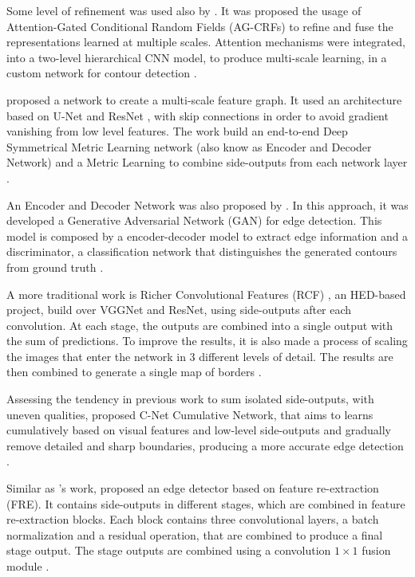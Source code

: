 Some level of refinement was used also by \cite{DeepStructured:2017:Xu20173962} \cite{Xu:2020}.
It was proposed the usage of Attention-Gated Conditional Random Fields (AG-CRFs) to refine and fuse the representations learned at multiple scales.
Attention mechanisms were integrated, into a two-level hierarchical CNN model, to produce multi-scale learning, in a custom network for contour detection \cite{DeepStructured:2017:Xu20173962}.

\cite{ProeminentEdge:2018:Cai2018} proposed a network to create a multi-scale feature graph.
It used an architecture based on U-Net \cite{Unet:2015} and ResNet \cite{RESNET:2016:7780459}, with skip connections in order to avoid gradient vanishing from low level features.
The work build an end-to-end Deep Symmetrical Metric Learning network (also know as Encoder and Decoder Network) and a Metric Learning to combine side-outputs from each network layer \cite{ProeminentEdge:2018:Cai2018}.

An Encoder and Decoder Network was also proposed by \cite{Yang:2019}.
In this approach, it was developed a Generative Adversarial Network (GAN) for edge detection.
This model is composed by a encoder-decoder model to extract edge information and a discriminator, a classification network that distinguishes the generated contours from ground truth \cite{Yang:2019}.

A more traditional work is Richer Convolutional Features (RCF) \cite{RCF:2019}, an HED-based project, build over VGGNet and ResNet, using side-outputs after each convolution.
At each stage, the outputs are combined into a single output with the sum of predictions.
To improve the results, it is also made a process of scaling the images that enter the network in 3 different levels of detail.
The results are then combined to generate a single map of borders \cite{RCF:2019}.

Assessing the tendency in previous work to sum isolated side-outputs, with uneven qualities, \cite{Cumulative:Song20181847} proposed C-Net Cumulative Network, that aims to learns cumulatively based on visual features and low-level side-outputs and gradually remove detailed and sharp boundaries, producing a more accurate edge detection \cite{Cumulative:Song20181847}.

Similar as \cite{Cumulative:Song20181847}'s work, \cite{ReExtraction:Wen201884} proposed an edge detector based on feature re-extraction (FRE).
It contains side-outputs in different stages, which are combined in feature re-extraction blocks.
Each block contains three convolutional layers, a batch normalization and a residual operation, that are combined to produce a final stage output.
The stage outputs are combined using a convolution $1 \times 1$ fusion module \cite{ReExtraction:Wen201884}.

